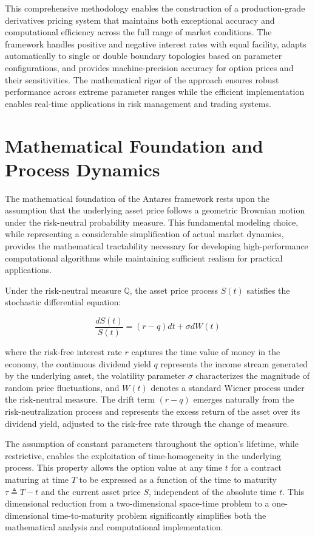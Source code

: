 \documentclass[
  american,
  11pt,
  11pt,
  letterpaper,
  onecolumn]{article}
\begin{document}
This comprehensive methodology enables the construction of a
production-grade derivatives pricing system that maintains both
exceptional accuracy and computational efficiency across the full range
of market conditions. The framework handles positive and negative
interest rates with equal facility, adapts automatically to single or
double boundary topologies based on parameter configurations, and
provides machine-precision accuracy for option prices and their
sensitivities. The mathematical rigor of the approach ensures robust
performance across extreme parameter ranges while the efficient
implementation enables real-time applications in risk management and
trading systems.

\section{Mathematical Foundation and Process
Dynamics}\label{mathematical-foundation-and-process-dynamics}

The mathematical foundation of the Antares framework rests upon the
assumption that the underlying asset price follows a geometric Brownian
motion under the risk-neutral probability measure. This fundamental
modeling choice, while representing a considerable simplification of
actual market dynamics, provides the mathematical tractability necessary
for developing high-performance computational algorithms while
maintaining sufficient realism for practical applications.

Under the risk-neutral measure \(\mathbb{Q}\), the asset price process
\(S(t)\) satisfies the stochastic differential equation:

\[\frac{dS(t)}{S(t)} = (r-q)dt + \sigma dW(t)\]

where the risk-free interest rate \(r\) captures the time value of money
in the economy, the continuous dividend yield \(q\) represents the
income stream generated by the underlying asset, the volatility
parameter \(\sigma\) characterizes the magnitude of random price
fluctuations, and \(W(t)\) denotes a standard Wiener process under the
risk-neutral measure. The drift term \((r-q)\) emerges naturally from
the risk-neutralization process and represents the excess return of the
asset over its dividend yield, adjusted to the risk-free rate through
the change of measure.

The assumption of constant parameters throughout the option's lifetime,
while restrictive, enables the exploitation of time-homogeneity in the
underlying process. This property allows the option value at any time
\(t\) for a contract maturing at time \(T\) to be expressed as a
function of the time to maturity \(\tau \triangleq T-t\) and the current
asset price \(S\), independent of the absolute time \(t\). This
dimensional reduction from a two-dimensional space-time problem to a
one-dimensional time-to-maturity problem significantly simplifies both
the mathematical analysis and computational implementation.
\end{document}
